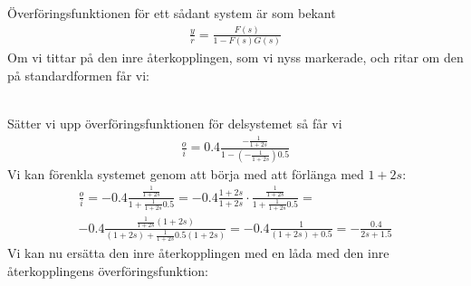 \documentclass[a4paper]{article}
\begin{document}
%
%
Överföringsfunktionen för ett sådant system är som bekant
\begin{align*}
  \frac{y}{r} = \frac{F(s)}{1 - F(s)G(s)}
\end{align*}
%
%
Om vi tittar på den inre återkopplingen, som vi nyss markerade, och ritar om den på standardformen får vi:\\
%
%
\\
%
%
Sätter vi upp överföringsfunktionen för delsystemet så får vi
\begin{align*}
  \frac{o}{i} = 0.4 \frac{-\frac{1}{1+2s}}{1-(-\frac{1}{1+2s})0.5}
\end{align*}
%
Vi kan förenkla systemet genom att börja med att förlänga med $1+2s$:
\begin{align*}
  \frac{o}{i} = -0.4 \frac{\frac{1}{1+2s}}{1+\frac{1}{1+2s}0.5} = -0.4 \frac{1+2s}{1+2s} \cdot \frac{\frac{1}{1+2s}}{1+\frac{1}{1+2s}0.5} =\\
  -0.4 \frac{\frac{1}{1+2s}(1+2s)}{(1+2s) + \frac{1}{1+2s}0.5(1+2s)} = -0.4 \frac{1}{(1+2s) + 0.5} = -\frac{0.4}{2s + 1.5}
\end{align*}
%
%
Vi kan nu ersätta den inre återkopplingen med en låda med den inre återkopp\-lingens överföringsfunktion:\\
%
%
\end{document}
